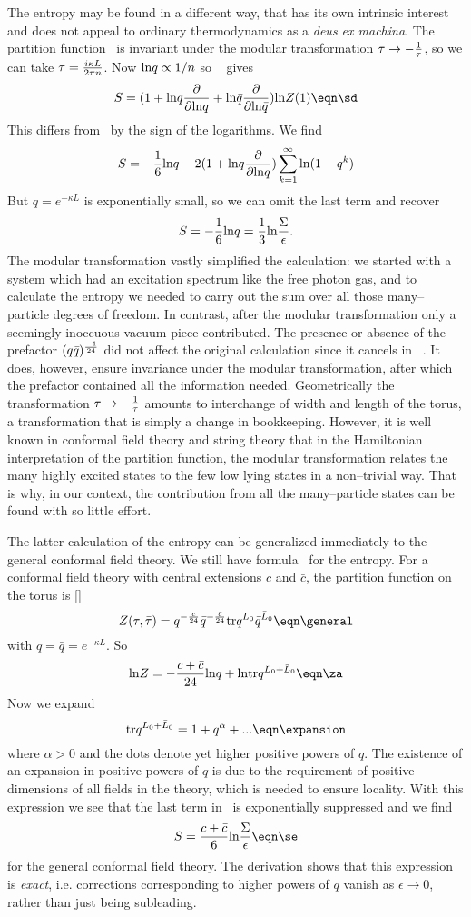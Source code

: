 The entropy may be found in a different way,
that has its own
intrinsic interest and does not appeal to
ordinary thermodynamics as a {\it deus ex machina}.
The partition function \ztorus\
is invariant under the modular transformation
$\tau\rightarrow -{1\over\tau}$, so
we can take $\tau={i\kappa L\over 2\pi n}$.
Now
${\rm ln} q\propto 1/n$ so \zn~ gives
$$
S = (1+{\rm ln}q{\partial\over\partial{\rm ln}q}
+{\rm ln}\bar{q}{\partial\over\partial{\rm ln}\bar{q}}
){\rm ln}Z(1)
\eqn\sd
$$
This differs
from \sc~by the sign of the logarithms. We find
$$
S = - {1\over 6}{\rm ln}q -2(1+{\rm ln}q{\partial\over\partial{\rm ln}q})
\sum_{k=1}^{\infty} {\rm ln} (1-q^k)
$$
But $q=e^{-\kappa L}$ is exponentially small, so we can omit the last
term and recover
$$
S=-{1\over 6}{\rm ln} q={1\over 3}{\rm ln}{\Sigma\over\epsilon}.
$$
The modular transformation vastly simplified the calculation:
we started with a system which had an excitation spectrum like
the free photon gas, and to calculate the entropy we needed to
carry out the sum over all those many--particle degrees of freedom.
In contrast,
after the modular transformation only a seemingly inoccuous vacuum
piece contributed. The presence or absence of
the prefactor $(q\bar{q})^{-1\over 24}$ did not affect
the original calculation since it cancels in \sc\ .
It does, however, ensure invariance under the modular transformation,
after which the prefactor contained all the information needed.
Geometrically the
transformation $\tau\rightarrow -{1\over\tau}$
amounts to interchange of width and length of the torus,
a transformation that is simply a change in bookkeeping.
However, it is well known in conformal field theory
and string theory that in the Hamiltonian interpretation
of the partition function,
the modular transformation relates the many highly excited states to
the few low lying states in a non--trivial way.  That is why,
in our context,
the contribution from all the many--particle states can be
found with so little effort.

The latter calculation of the entropy can be generalized immediately to
the general conformal field theory. We still have formula \sd~for
the entropy. For a conformal field theory
with central extensions $c$ and $\bar{c}$,
the partition function on the torus is
[\ginsparg ]
$$
Z(\tau,\bar\tau)= q^{-{c\over 24}}\bar{q}^{-{\bar{c}\over 24}}{\rm tr}
q^{L_0}\bar q^{\bar L_0}
\eqn\general
$$
with $q=\bar q=e^{-\kappa L}$. So
$$
{\rm ln}Z=-{c+\bar{c}\over 24}{\rm ln}q + {\rm ln}{\rm tr} q^{L_0+\bar L_0}
\eqn\za
$$
Now we expand
$$
{\rm tr}q^{L_0+\bar L_0} = 1 + q^{\alpha}+ ...
\eqn\expansion
$$
where $\alpha>0$ and the
dots denote yet higher positive powers of $q$.
The existence of an expansion in positive powers of $q$ is due to the
requirement of positive dimensions of all fields in the theory,
which is needed to ensure locality. With this expression we see that
the last term in \za~is exponentially suppressed and we find
$$
S={c+\bar{c}\over 6}{\rm ln}{\Sigma\over\epsilon}
\eqn\se
$$
for the general conformal field theory.
The derivation shows that this expression is {\it exact}, i.e.
corrections corresponding to higher powers of $q$
vanish as $\epsilon\rightarrow 0$, rather than just being subleading.

